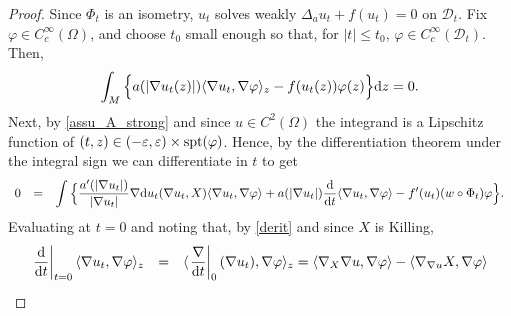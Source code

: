 \documentclass[10 pt,a4paper]{article}
\theoremstyle{definition}
\begin{document}
\begin{proof}
	Since $\Phi_t$ is an isometry, $u_t$ solves weakly $\Delta_a u_t + f(u_t) = 0$ on $\mathscr{D}_t$. Fix $\varphi \in C^\infty_c(\Omega)$, and choose $t_0$ small enough so that, for $|t| \le t_0$, $\varphi \in C^\infty_c(\mathscr{D}_{t})$. Then,  
	\[
	\int_M \Big\{ a(|\nabla u_t(z)|) \langle \nabla u_t, \nabla \varphi\rangle_z - f(u_t(z))\varphi(z) \Big\} \mathrm{d} z = 0.
	\]
	Next, by \eqref{assu_A_strong} and since $u \in C^2(\Omega)$ the integrand is a Lipschitz function of $(t, z) \in (-\eps, \eps) \times {\rm spt}(\varphi)$. Hence, by the differentiation theorem under the integral sign we can differentiate in $t$ to get 
	\begin{equation}\label{diffeinte}
		\begin{array}{lcl}         
			0 & = & \displaystyle \displaystyle \int \Big\{\frac{a'(|\nabla u_t|)}{|\nabla u_t|} \nabla \mathrm{d}  u_t(\nabla u_t,X) \langle \nabla u_t, \nabla \varphi\rangle + a(|\nabla u_t|) \frac{\mathrm{d}}{\mathrm{d} t}\langle \nabla u_t, \nabla \varphi \rangle - f'(u_t)(w \circ \Phi_t)\varphi\Big\}.
		\end{array}
	\end{equation}
	Evaluating at $t=0$ and noting that, by \eqref{derit} and since $X$ is Killing,
	$$
	\begin{array}{lcl}
		\disp \left.\frac{\di}{\di t}\right|_{t=0}\langle \nabla u_t, \nabla \varphi \rangle_z & = & \disp \langle \left.\frac{\nabla}{\di t}\right|_0(\nabla u_t), \nabla \varphi \rangle_z = \langle \nabla_X \nabla u, \nabla \varphi \rangle - \langle \nabla_{\nabla u} X, \nabla \varphi \rangle \\[0.3cm]

\end{array}$$
\end{proof}
\end{document}
